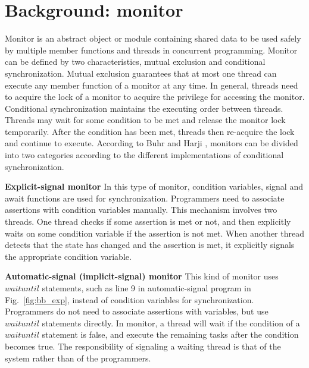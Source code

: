 \documentclass[preprint]{sigplanconf}
\begin{document}
\section{Background: monitor} \label{sec:bg} 
Monitor is an abstract object or module containing shared data to be used safely
by multiple member functions and threads in concurrent programming. Monitor can
be defined by two characteristics, mutual exclusion and conditional 
synchronization. Mutual exclusion guarantees that at most one thread can 
execute any member function of a monitor at any time.  In general, threads need to acquire the lock of a monitor 
to acquire the privilege for accessing the monitor. Conditional synchronization 
maintains the executing order between threads. Threads may wait for some 
condition to be met and release the monitor lock temporarily. After the 
condition has been met, threads then re-acquire the lock and continue to 
execute. According to Buhr and Harji \cite{bh05}, monitors can be divided into 
two categories according to the different implementations of conditional 
synchronization. 
\begin{description}
    \item{\bf Explicit-signal monitor} In this type of monitor, condition
    variables, signal and await functions are used for synchronization. 
    Programmers need to associate assertions with condition variables manually.
    This mechanism involves two threads. One thread checks if some
    assertion is met or not, and then explicitly waits on some condition variable 
    if the assertion is not met. When another thread detects that the state has 
    changed and the assertion is met, it explicitly signals the 
    appropriate condition variable.
    \item{\bf Automatic-signal (implicit-signal) monitor} This kind of monitor 
    uses $waituntil$
    statements, such as line 9 in automatic-signal program in
    Fig.~\ref{fig:bb_exp}, instead of condition variables for
    synchronization. Programmers do not need to associate assertions with
    variables, but use $waituntil$ statements directly. In
    monitor, a thread will wait if the condition of a $waituntil$
    statement is false, and execute the remaining tasks after the condition 
    becomes true. The responsibility of signaling a waiting thread is that of 
    the system rather than of the programmers. 
\end{description}
\end{document}
